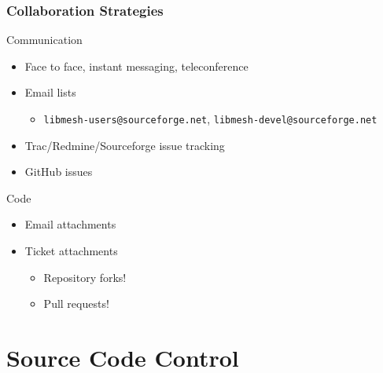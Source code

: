 \documentclass[mathserif]{beamer}
\newcommand{\libMesh}{\texttt{libMesh}\xspace}
\begin{document}
\begin{frame}
\frametitle{Collaboration Strategies}

\begin{block}{Communication}
\begin{itemize}
	\item Face to face, instant messaging, teleconference
	\item Email lists
	\begin{itemize}
		\item \texttt{libmesh-users@sourceforge.net},
			\texttt{libmesh-devel@sourceforge.net}
	\end{itemize}
	\item Trac/Redmine/Sourceforge issue tracking
	\item GitHub issues
\end{itemize}
\end{block}

\begin{block}{Code}
\begin{itemize}
	\item Email attachments
	\item Ticket attachments
	\begin{itemize}
		\item Repository forks!
		\item Pull requests!
	\end{itemize}
\end{itemize}
\end{block}

\end{frame}



\section{Source Code Control}

\end{document}
